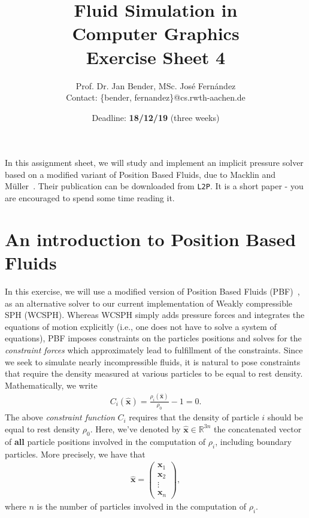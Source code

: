 \documentclass[11pt,a4paper,onesided]{vci_anim_exercise}
\title{Fluid Simulation in\\Computer Graphics\\Exercise Sheet 4}
\author{Prof. Dr. Jan Bender, MSc. José Fernández\\{\scriptsize Contact: \{bender, fernandez\}@cs.rwth-aachen.de}}
\date{Deadline: \textbf{18/12/19} (three weeks)}
\renewcommand{\vec}[1]{\boldsymbol{\mathbf{#1}}}
\begin{document}
\maketitle

In this assignment sheet, we will study and implement an implicit pressure solver based on a modified variant of Position Based Fluids, due to Macklin and Müller~\cite{mm13}. Their publication can be downloaded from \texttt{L2P}. It is a short paper - you are encouraged to spend some time reading it.

\section*{An introduction to Position Based Fluids}
In this exercise, we will use a modified version of Position Based Fluids (PBF)~\cite{mm13}, as an alternative solver to our current implementation of Weakly compressible SPH (WCSPH). Whereas WCSPH simply adds pressure forces and integrates the equations of motion explicitly (i.e., one does not have to solve a system of equations), PBF imposes constraints on the particles positions and solves for the \emph{constraint forces} which approximately lead to fulfillment of the constraints. Since we seek to simulate nearly incompressible fluids, it is natural to pose constraints that require the density measured at various particles to be equal to rest density. Mathematically, we write
\begin{align}
C_i(\hat{\vec x}) = \frac{\rho_i (\hat{\vec x})}{\rho_0} - 1 = 0.
\end{align}
The above \emph{constraint function} $C_i$ requires that the density of particle $i$ should be equal to rest density $\rho_0$. Here, we've denoted by $\hat{\vec x} \in \mathbb{R}^{3n}$ the concatenated vector of \textbf{all} particle positions involved in the computation of $\rho_i$, including boundary particles. More precisely, we have that
\begin{align*}
\hat{\vec x} = \begin{pmatrix}
\vec x_1 \\
\vec x_2 \\
\vdots \\
\vec x_n
\end{pmatrix},
\end{align*}
where $n$ is the number of particles involved in the computation of $\rho_i$. 
\end{document}

